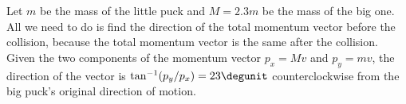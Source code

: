 Let $m$ be the mass of the little puck and $M=2.3m$ be
the mass of the big one. All we need to do is find the
direction of the total momentum vector before the collision,
because the total momentum vector is the same after the
collision. Given the two components of the momentum vector
$p_x=Mv$ and $p_y=mv$, the direction of the
vector is $\tan^{-1}(p_y/p_x)=23\degunit$ counterclockwise from
the big puck's original direction of motion.

